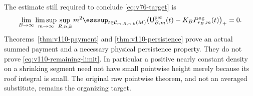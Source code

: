 The estimate still required to conclude \eqref{eq:v76-target} is
\begin{equation}\label{eq:v110-remaining-limit}
 \lim_{B\to\infty}\limsup_{m\to\infty}\sup_{R,n,k}m^2
 \esssup_{t\in\mathcal C_{m,R,n,k}(M)}
 \bigl(\mathsf U_{B,m}^{\rm per}(t)
                    -K_BP_{r_B,m}^{\rm ng}(t)\bigr)_+=0.
\end{equation}
Theorems~\ref{thm:v110-payment} and \ref{thm:v110-persistence}
prove an actual summed payment and a necessary physical persistence
property. They do not prove \eqref{eq:v110-remaining-limit}. In
particular a positive nearly constant density on a shrinking segment
need not have small pointwise height merely because its roof integral
is small. The original raw pointwise theorem, and not an averaged
substitute, remains the organizing target.
